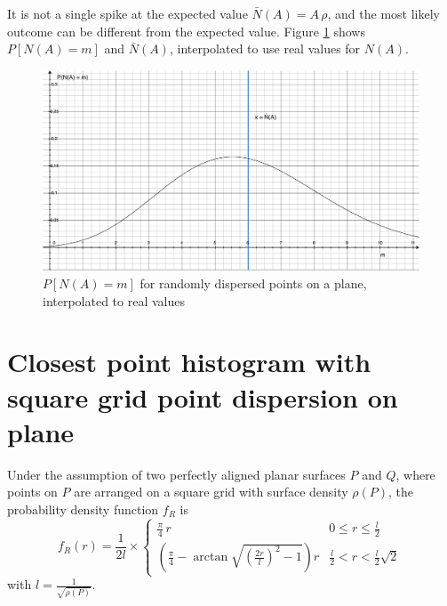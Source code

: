 It is not a single spike at the expected value $\bar{N}(A) = A \, \rho$, and the most likely outcome can be different from the expected value. Figure \ref{fig:plane_rand_n} shows $P[N(A) = m]$ and $\bar{N}(A)$, interpolated to use real values for $N(A)$.

\begin{figure}[h]
\centering
\includegraphics[width=.6\textwidth]{fig/plane_rand_n.pdf}
\caption{$P[N(A) = m]$ for randomly dispersed points on a plane, interpolated to real values}
\label{fig:plane_rand_n}
\end{figure}


\section{Closest point histogram with square grid point dispersion on plane} \label{sec:proof_sqgrid_disp_plane}
Under the assumption of two perfectly aligned planar surfaces $P$ and $Q$, where points on $P$ are arranged on a square grid with surface density $\rho(P)$, the probability density function $f_R$ is
\begin{equation}
f_R(r) = \frac{1}{2 l} \times \begin{cases}
	\frac{\pi}{4} \, r & 0 \leq r \leq \frac{l}{2} \\
	\left( \frac{\pi}{4} - \arctan{\sqrt{\left( \frac{2r}{l} \right)^2 - 1}} \right) r & \frac{l}{2} < r < \frac{l}{2} \sqrt{2}
\end{cases}
\end{equation}
with $l = \frac{1}{\sqrt{\rho(P)}}$.

